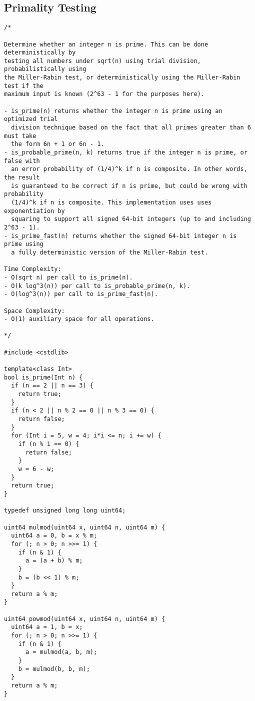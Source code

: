 \subsection{Primality Testing}
\begin{lstlisting}
/*

Determine whether an integer n is prime. This can be done deterministically by
testing all numbers under sqrt(n) using trial division, probabilistically using
the Miller-Rabin test, or deterministically using the Miller-Rabin test if the
maximum input is known (2^63 - 1 for the purposes here).

- is_prime(n) returns whether the integer n is prime using an optimized trial
  division technique based on the fact that all primes greater than 6 must take
  the form 6n + 1 or 6n - 1.
- is_probable_prime(n, k) returns true if the integer n is prime, or false with
  an error probability of (1/4)^k if n is composite. In other words, the result
  is guaranteed to be correct if n is prime, but could be wrong with probability
  (1/4)^k if n is composite. This implementation uses uses exponentiation by
  squaring to support all signed 64-bit integers (up to and including 2^63 - 1).
- is_prime_fast(n) returns whether the signed 64-bit integer n is prime using
  a fully deterministic version of the Miller-Rabin test.

Time Complexity:
- O(sqrt n) per call to is_prime(n).
- O(k log^3(n)) per call to is_probable_prime(n, k).
- O(log^3(n)) per call to is_prime_fast(n).

Space Complexity:
- O(1) auxiliary space for all operations.

*/

#include <cstdlib>

template<class Int>
bool is_prime(Int n) {
  if (n == 2 || n == 3) {
    return true;
  }
  if (n < 2 || n % 2 == 0 || n % 3 == 0) {
    return false;
  }
  for (Int i = 5, w = 4; i*i <= n; i += w) {
    if (n % i == 0) {
      return false;
    }
    w = 6 - w;
  }
  return true;
}

typedef unsigned long long uint64;

uint64 mulmod(uint64 x, uint64 n, uint64 m) {
  uint64 a = 0, b = x % m;
  for (; n > 0; n >>= 1) {
    if (n & 1) {
      a = (a + b) % m;
    }
    b = (b << 1) % m;
  }
  return a % m;
}

uint64 powmod(uint64 x, uint64 n, uint64 m) {
  uint64 a = 1, b = x;
  for (; n > 0; n >>= 1) {
    if (n & 1) {
      a = mulmod(a, b, m);
    }
    b = mulmod(b, b, m);
  }
  return a % m;
}


\end{lstlisting}
